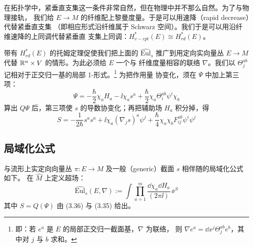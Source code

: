 在拓扑学中，紧垂直支集这一条件非常自然，但在物理中并不那么自然。为了与物理接轨，
我们给 $E\to M$ 的纤维配上黎曼度量。于是可以用速降（rapid decrease）代替紧垂直支集
（即相应形式沿纤维属于 Schwarz 空间）。我们于是可以用沿纤维速降的上同调代替紧垂直
支集上同调：$H^{\ast}_{v-cpt}(E)\cong H^{\ast}_{rd}(E)$。

带有 $H^{\ast}_{rd}(E)$ 的托姆定理促使我们把上面的 $\widehat{\mathrm{Eul}}_s$
推广到用定向实向量丛 $E\to M$ 代替 $\mathbb{R}^n\times V$ 的情形。为此必须给 $E$ 一个与
纤维度量相容的联络 $\nabla$。我们以 $\Theta_j^{ab}$ 记相对于正交归一基的局部
1-形式。\footnote{即：若 $e^a$ 是 $E$ 的局部正交归一截面基，$\nabla$ 为联络，
则 $\nabla e^a=\dd x^j\Theta_j^{ab}e^b$，其中对 $j$ 与 $b$ 求和。} 为把作用量
协变化，须在 $\Psi$ 中加上第三项：
\begin{equation}
\Psi = -\frac{\hbar}{2}\chi_aH_a-\ii\chi_a s^a
+\frac{\hbar}{2}\chi_a\Theta_i^{ab}\psi^i\chi_b
\tag{3.35}
\end{equation}
算出 $Q\Psi$ 后，第三项使 $s$ 的导数协变化；再把辅助场 $H_a$ 积分掉，得
\begin{equation}
S = -\frac{1}{2\hbar}s^as^a+\ii\chi_a(\nabla_js)^a\psi^j
+\frac{\hbar}{4}\chi_a\chi_bF_{ij}^{ab}\psi^i\psi^j
\tag{3.36}
\end{equation}

\subsection{局域化公式}

与流形上实定向向量丛 $\pi:E\to M$ 及一般（generic）截面 $s$ 相伴随的局域化公式
如下。
在 $\widehat M$ 上定义超场：
\begin{equation}
\widehat{\mathrm{Eul}}_s(E,\nabla) := \int\prod_{a=1}^{m}
\frac{\dd\chi_a\dd H_a}{(2\pi\ii)}\,\ee^{S}
\tag{3.37}
\end{equation}
其中 $S=Q(\Psi)$ 由 (3.36) 与 (3.35) 给出。

